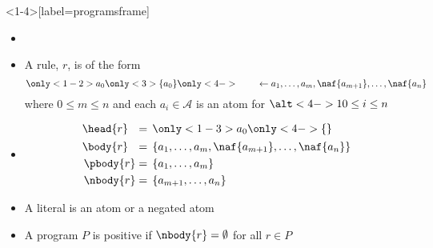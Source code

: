 \begin{frame}<1-4>[label=programsframe]{%
              }%
  \label{eqn:rule}
  \begin{itemize}
  \item %
  \item %
    A \alert<2-4>{} \alert<1-4>{rule}, $r$, is of the form
    \[
                  {\only<1-2>{a_0}\only<3>{\{a_0\}}\only<4->{\phantom{\{a_0\}}} \leftarrow   a_1,\dots,a_m,          \naf{a_{m+1}},\dots,          \naf{a_n}}
    \]
    where $0\leq m\leq n$ and each $a_i\in{\mathcal{A}}$ is an atom for $\alt<4->{1}{0}\leq i\leq n$
  \item %
    \begin{align*}
      \head{r}\phantom{^+}    &=\, \only<1-3>{a_0}\only<4->{{\{\}}}
      \\
      \body{r}\phantom{^+}    &=\, \{a_1,\dots,a_m,\naf{a_{m+1}},\dots,\naf{a_n}\}
      \\
      \pbody{r}               &=\, \{a_1,\dots,a_m\}
      \\
      \nbody{r}               &=\, \{a_{m+1},\dots,a_n\}
    \end{align*}%
  \item %
  A \alert<1>{literal} is an atom or a negated atom
  \item %
  A program $P$ is \alert<1>{positive} if $\nbody{r}=\emptyset$ for all $r\in P$
  \end{itemize}


\end{frame}
